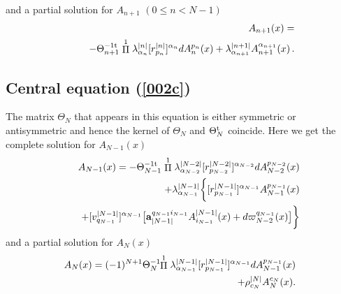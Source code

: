 \documentclass[prd,a4paper,twocolumn,amssymb,amsmath,nofootinbib,showpacs]{revtex4}
\begin{document}
and a partial solution for $A_{n+1}$ $(0\leq n<N-1)$
\begin{eqnarray}
&&\hspace{-.8cm}A_{n+1}(x)=\label{solparAn+1}\\
&&\hspace{.4cm}-\Theta_{n+1}^{-1\rm{t}}\stackrel{1}{\Pi}
\lambda_{\alpha_n}^{|n|} [r^{|n|}_{p_n}]^{\alpha_n} dA_n^{p_n}(x)+
\lambda_{\alpha_{n+1}}^{|n+1|}A_{n+1}^{\alpha_{n+1}}(x)\,.\nonumber
\end{eqnarray}
\subsection{\label{Eq3} Central equation (\ref{002c})}
The matrix $\Theta_N$ that appears in this equation is either
symmetric or antisymmetric and hence the kernel of $\Theta_N$ and
$\Theta_N^{\rm{t}}$ coincide. Here we get the complete solution
for $A_{N-1}(x)$
\begin{eqnarray}
&&\hspace{-.5cm}A_{N-1}(x)=-\Theta_{N-1}^{-1\rm{t}}\stackrel{1}{\Pi}
\lambda_{\alpha_{N-2}}^{|N-2|}[r^{|N-2|}_{p_{N-2}}]^{\alpha_{N-2}}
dA_{N-2}^{p_{N-2}}(x)\nonumber\\
&&\hspace{-.5cm}+\lambda_{\alpha_{N-1}}^{|N-1|}
\bigg\{[r^{|N-1|}_{p_{N-1}}]^{\alpha_{N-1}}A^{p_{N-1}}_{N-1}(x)\label{solcompAN-1}\\
&&\hspace{.3cm}+[v^{|{N-1}|}_{q_{N-1}}]^{\alpha_{N-1}}
\big[\mathbf{a}_{|{N-1}|}^{q_{N-1}i_{N-1}}
A^{|{N-1}|}_{i_{N-1}}(x)+d\varpi_{N-2}^{q_{N-1}}(x)\big]\bigg\}
\nonumber
\end{eqnarray}
and a partial solution for $A_N(x)$
\begin{eqnarray}
&&\hspace{-.5cm}A_{N}(x)=(-1)^{N+1}\Theta_{N}^{-1}\!\!\stackrel{1}{\Pi}
\lambda_{\alpha_{N-1}}^{|N-1|}
[r^{|N-1|}_{p_{N-1}}]^{\alpha_{N-1}} dA_{N-1}^{p_{N-1}}(x)\nonumber\\
&& \hspace{.9cm}+\rho_{c_N}^{|N|}A_{N}^{c_{N}}(x).\label{solparAN}
\end{eqnarray}
\end{document}

